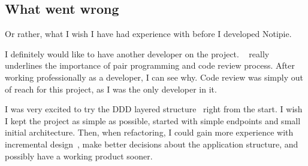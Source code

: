 \subsection{What went wrong}\label{sec:what-went-wrong}

Or rather,
what I wish I have had experience with
before I developed Notipie.

I definitely would like to have another developer
on the project.
~\cite{beck_extreme_2004}
really underlines the importance of pair programming
and code review process.
After working professionally as a developer,
I can see why.
Code review was simply out of reach for this project,
as I was the only developer in it.

I was very excited to try the
DDD layered structure~\cite{evans_domain-driven_2003}
right from the start.
I wish I kept the project as simple as possible,
started with simple endpoints
and small initial architecture.
Then, when refactoring,
I could gain more experience
with incremental design~\cite{fowler_refactoring_2019,beck_extreme_2004},
make better decisions about the application structure,
and possibly have a working product sooner.
